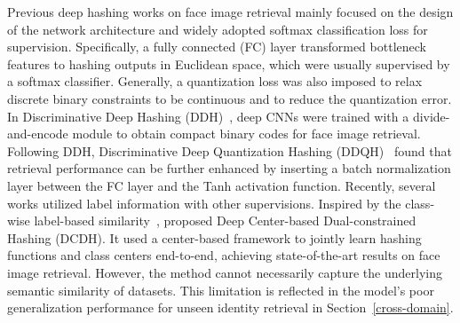 \documentclass{elsarticle}
\begin{document}
Previous deep hashing works on face image retrieval mainly focused on the design of the network architecture and widely adopted softmax classification loss for supervision. Specifically, a fully connected (FC) layer transformed bottleneck features to hashing outputs in Euclidean space, which were usually supervised by a softmax classifier. Generally, a quantization loss was also imposed to relax discrete binary constraints to be continuous and to reduce the quantization error. In Discriminative Deep Hashing (DDH)~\cite{lin2017discriminative}, deep CNNs were trained with a divide-and-encode module to obtain compact binary codes for face image retrieval. Following DDH, Discriminative Deep Quantization Hashing (DDQH)~\cite{tang2018discriminative} found that retrieval performance can be further enhanced by inserting a batch normalization layer between the FC layer and the Tanh activation function. Recently, several works utilized label information with other supervisions. 
Inspired by the class-wise label-based similarity~\cite{zhe2019deep}, \cite{zhang2021deep} proposed Deep Center-based Dual-constrained Hashing (DCDH). It used a center-based framework to jointly learn hashing functions and class centers end-to-end, achieving state-of-the-art results on face image retrieval. However, the method cannot necessarily capture the underlying semantic similarity of datasets. This limitation is reflected in the model's poor generalization performance for unseen identity retrieval in Section~\ref{cross-domain}. 
\end{document}
